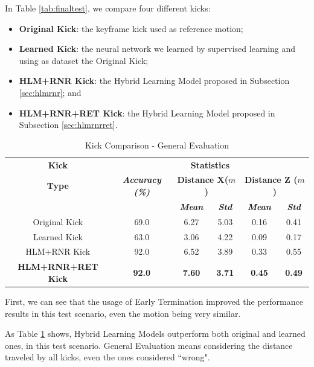 In Table \ref{tab:finaltest}, we compare four different kicks:

\begin{itemize}
	\item \textbf{Original Kick}: the keyframe kick used as reference motion;
	\item \textbf{Learned Kick}: the neural network we learned by supervised learning and using as dataset the Original Kick;
	\item \textbf{HLM+RNR Kick}: the Hybrid Learning Model proposed in Subsection \ref{sec:hlmrnr}; and
	\item \textbf{HLM+RNR+RET Kick}: the Hybrid Learning Model proposed in Subsection \ref{sec:hlmrnrret}.
\end{itemize}

\begin{table}[!htbp]
	\caption{Kick Comparison - General Evaluation}
	\begin{center} 
		\begin{tabular}{|c|c|c|c|c|c|}
			\hline
			\textbf{Kick}&\multicolumn{5}{|c|}{\textbf{Statistics}} \\
			\cline{2-6} 
			\textbf{Type} & \textbf{\textit{Accuracy (\%)}}& \multicolumn{2}{|c|}{\textbf{Distance X(\(m\))}}& 
			\multicolumn{2}{|c|}{\textbf{Distance Z (\(m\))}}\\
			\cline {3-6} 
			& & \textbf{\textit{Mean}}& \textbf{\textit{Std}}
			& \textbf{\textit{Mean}}& \textbf{\textit{Std}}\\
			\hline
			Original Kick & 69.0 & 6.27 & 5.03 & 0.16 & 0.41 \\
			\hline
			Learned Kick & 63.0 & 3.06 & 4.22 & 0.09 & 0.17 \\
			\hline
			HLM+RNR Kick  & 92.0 & 6.52 & 3.89 & 0.33 & 0.55  \\
			\hline
			\textbf{HLM+RNR+RET Kick}  & \textbf{92.0} & \textbf{7.60} & \textbf{3.71} & \textbf{0.45} & \textbf{0.49}  \\
			\hline
		\end{tabular}
		\label{table:finaltest}
	\end{center}
\end{table}

First, we can see that the usage of Early Termination improved the performance results in this test scenario, even the motion being very similar.

As Table \ref{table:finaltest} shows, Hybrid Learning Models outperform both original and learned ones, in this test scenario. General Evaluation means considering the distance traveled by all kicks, even the ones considered ``wrong".

